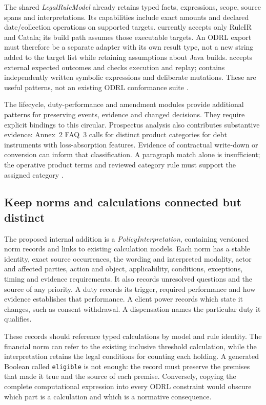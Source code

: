 The shared \emph{LegalRuleModel} already retains typed facts, expressions,
scope, source spans and interpretations. Its capabilities include exact
amounts and declared date/collection operations on supported targets.
 currently accepts only RuleIR and Catala;
its build path assumes those executable targets. An ODRL export must therefore
be a separate adapter with its own result type, not a new string added to
the target list while retaining assumptions about Java builds.
 accepts external expected outcomes and
checks execution and replay;  contains independently
written symbolic expressions and deliberate mutations. These are useful
patterns, not an existing ODRL conformance suite
\citep{hkmaodrlsoftware2026}.

The lifecycle, duty-performance and amendment modules provide additional
patterns for preserving events, evidence and changed decisions. They require
explicit bindings to this circular. Prospectus analysis also contributes
substantive evidence: Annex~2 FAQ~3 calls for distinct product categories for
debt instruments with loss-absorption features. Evidence of contractual
write-down or conversion can inform that classification. A paragraph match
alone is insufficient; the operative product terms and reviewed category
rule must support the assigned category \citep[FAQ~3]{sfcspiannex2}.

\subsection{Keep norms and calculations connected but distinct}

The proposed internal addition is a \emph{PolicyInterpretation}, containing
versioned norm records and links to existing calculation models. Each norm
has a stable identity, exact source occurrences, the wording and interpreted
modality, actor and affected parties, action and object, applicability,
conditions, exceptions, timing and evidence requirements. It also records
unresolved questions and the source of any priority. A duty records its
trigger, required performance and how evidence establishes that performance.
A client power records which state it changes, such as consent withdrawal.
A dispensation names the particular duty it qualifies.

These records should reference typed calculations by model and rule identity.
The financial norm can refer to the existing inclusive threshold calculation,
while the interpretation retains the legal conditions for counting each
holding. A generated Boolean called \texttt{eligible} is not enough: the
record must preserve the premises that made it true and the source of each
premise. Conversely, copying the complete computational expression into every
ODRL constraint would obscure which part is a calculation and which is a
normative consequence.

